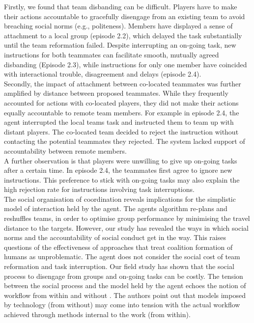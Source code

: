 Firstly, we found that team disbanding can be difficult. Players have to make their actions accountable to gracefully disengage from an existing team to avoid breaching social norms (e.g., politeness). Members have displayed a sense of attachment to a local group (episode 2.2), which delayed the task substantially until the team reformation failed. Despite interrupting an on-going task, new instructions for both teammates can facilitate smooth, mutually agreed disbanding (Episode 2.3), while instructions for only one member have coincided with interactional trouble, disagreement and delays (episode 2.4). \\

Secondly, the impact of attachment between co-located teammates was further amplified by distance between proposed teammates. While they frequently accounted for actions with co-located players, they did not make their actions equally accountable to remote team members. For example in episode 2.4, the agent interrupted the local teams task and instructed them to team up with distant players. The co-located team decided to reject the instruction without contacting the potential teammates they rejected. The system lacked support of accountability between remote members. \\

A further observation is that players were unwilling to give up on-going tasks after a certain time. In episode 2.4, the teammates first agree to ignore new instructions. This preference to stick with on-going tasks may also explain the high rejection rate for instructions involving task interruptions. \\

The social organisation of coordination reveals implications for the simplistic model of interaction held by the agent. The agents algorithm re-plans and reshuffles teams, in order to optimise group performance by minimising the travel distance to the targets. However, our study has revealed the ways in which social norms and the accountability of social conduct get in the way. This raises questions of the effectiveness of approaches that treat coalition formation of humans as unproblematic. The agent does not consider the social cost of team reformation and task interruption. Our field study has shown that the social process to disengage from groups and on-going tasks can be costly. The tension between the social process and the model held by the agent echoes the notion of workflow from within and without \cite{Bowers1994}. The authors point out that models imposed by technology (from without) may come into tension with the actual workflow achieved through methods internal to the work (from within). 

